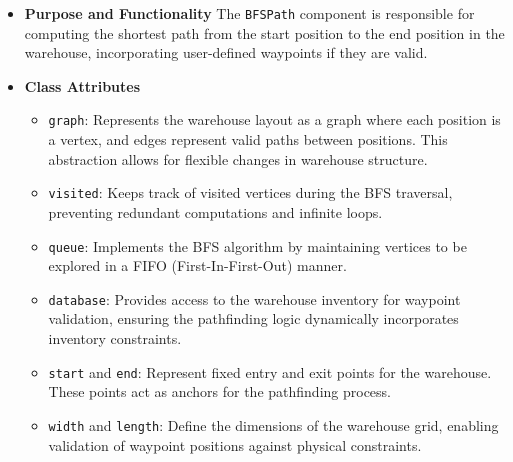 \begin{itemize}
    \item \textbf{Purpose and Functionality} \newline
    The \verb|BFSPath| component is responsible for computing the shortest path from the start position to the end position in the warehouse, incorporating user-defined waypoints if they are valid.

    \item \textbf{Class Attributes}
    \begin{itemize}
        \item {\verb|graph|:} Represents the warehouse layout as a graph where each position is a vertex, and edges represent valid paths between positions. This abstraction allows for flexible changes in warehouse structure.
        \item {\verb|visited|:} Keeps track of visited vertices during the BFS traversal, preventing redundant computations and infinite loops.
        \item {\verb|queue|:} Implements the BFS algorithm by maintaining vertices to be explored in a FIFO (First-In-First-Out) manner.
        \item {\verb|database|:} Provides access to the warehouse inventory for waypoint validation, ensuring the pathfinding logic dynamically incorporates inventory constraints.
        \item {\verb|start| and \verb|end|:} Represent fixed entry and exit points for the warehouse. These points act as anchors for the pathfinding process.
        \item {\verb|width| and \verb|length|:} Define the dimensions of the warehouse grid, enabling validation of waypoint positions against physical constraints.
    \end{itemize}


\end{itemize}
